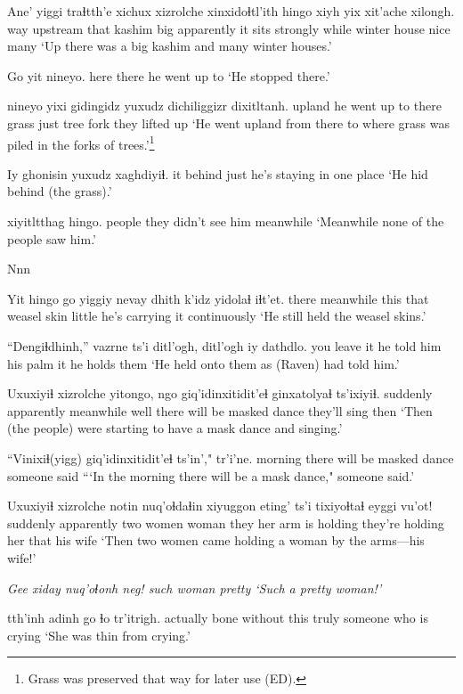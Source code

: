 \documentclass[12pt]{article}
\begin{document}
\gll Ane' yiggi traɬtth'e xichux xizrolche xinxidoɬtl'ith hingo {xiyh yix} xit'ache xilongh.
{way upstream} that kashim big apparently {it sits strongly} while {winter house} nice many
\glt `Up there was a big kashim and many winter houses.'
\glend

\gll Go yit nineyo.
here there {he went up to}
\glt `He stopped there.'
\glend

 nineyo yixi gidingidz yuxudz dichiliggizr dixitltanh.
upland {he went up to} there grass just {tree fork} {they lifted up}
\glt `He went upland from there to where grass was piled in the forks of trees.'\footnote{Grass was preserved that way for later use (ED).}
\glend

\gll Iy ghonisin yuxudz xaghdiyiɬ.
it {behind} just {he's staying in one place}
\glt `He hid behind (the grass).'
\glend

 xiyitltthag hingo.
people {they didn't see him} meanwhile
\glt `Meanwhile none of the people saw him.'
\glend

Nnn 

\gll Yit hingo go yiggiy nevay dhith k'idz yidolaɬ iɬt'et.
there meanwhile this that weasel skin little {he's carrying it} continuously
\glt `He still held the weasel skins.'
\glend

\gll ``Dengiɬdhinh,'' vazrne ts'i ditl'ogh, ditl'ogh iy dathdlo.
{you leave it} {he told him} {} {his palm} {} it {he holds them}
\glt `He held onto them as (Raven) had told him.'
\glend

\gll Uxuxiyiɬ xizrolche yitongo, ngo giq'idinxitidit'eɬ ginxatolyaɬ ts'ixiyiɬ.
suddenly apparently meanwhile well {there will be masked dance} {they'll sing} then
\glt `Then (the people) were starting to have a mask dance and singing.'
\glend

\gll ``Vinixiɬ(yigg) giq'idinxitidit'eɬ ts'in'," tr'i'ne. 
morning {there will be masked dance} {} {someone said}
\glt ```In the morning there will be a mask dance," someone said.'
\glend

\gll Uxuxiyiɬ xizrolche notin nuq'oɬdaɬin xiyuggon eting' ts'i tixiyoɬtaɬ eyggi vu'ot!
suddenly apparently {two women} woman {they her arm} {is holding} {} {they're holding her} that {his wife}
\glt `Then two women came holding a woman by the arms---his wife!'
\glend

\gll \em Gee xiday nuq'oɬonh neg!
{} such woman pretty
\glt `Such a pretty woman!'
\glend

 tth'inh adinh go ɬo tr'itrigh. 
actually bone without this truly {someone who is crying} 
\glt `She was thin from crying.'
\glend
\end{document}
